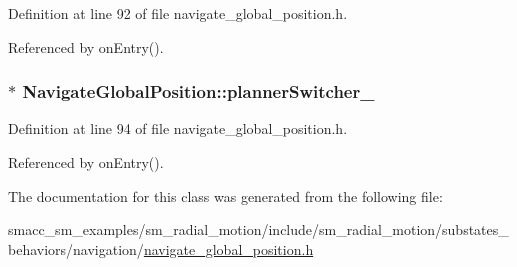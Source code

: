 Definition at line 92 of file navigate\+\_\+global\+\_\+position.\+h.



Referenced by on\+Entry().

\subsubsection[{\texorpdfstring{planner\+Switcher\+\_\+}{plannerSwitcher_}}]{$\ast$ Navigate\+Global\+Position\+::planner\+Switcher\+\_\+\hspace{0.3cm}{\ttfamily [private]}}\hypertarget{classNavigateGlobalPosition_a544cf45f4233da0ebaf33813730143f9}{}\label{classNavigateGlobalPosition_a544cf45f4233da0ebaf33813730143f9}


Definition at line 94 of file navigate\+\_\+global\+\_\+position.\+h.



Referenced by on\+Entry().



The documentation for this class was generated from the following file\+:\begin{DoxyCompactItemize}
\item 
smacc\+\_\+sm\+\_\+examples/sm\+\_\+radial\+\_\+motion/include/sm\+\_\+radial\+\_\+motion/substates\+\_\+behaviors/navigation/\hyperlink{navigate__global__position_8h}{navigate\+\_\+global\+\_\+position.\+h}\end{DoxyCompactItemize}
